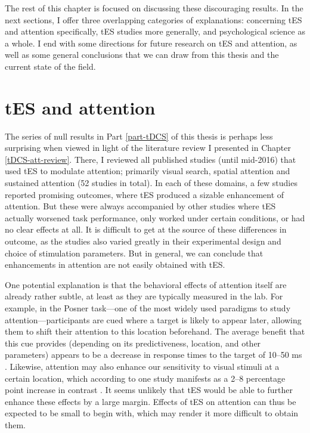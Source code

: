 \documentclass[11pt,english,]{memoir}
\begin{document}
The rest of this chapter is focused on discussing these discouraging results. In the next sections, I offer three overlapping categories of explanations: concerning tES and attention specifically, tES studies more generally, and psychological science as a whole. I end with some directions for future research on tES and attention, as well as some general conclusions that we can draw from this thesis and the current state of the field.

\hypertarget{tes-and-attention}{%
\section{tES and attention}\label{tes-and-attention}}

The series of null results in Part \ref{part-tDCS} of this thesis is perhaps less surprising when viewed in light of the literature review I presented in Chapter \ref{tDCS-att-review}. There, I reviewed all published studies (until mid-2016) that used tES to modulate attention; primarily visual search, spatial attention and sustained attention (52 studies in total). In each of these domains, a few studies reported promising outcomes, where tES produced a sizable enhancement of attention. But these were always accompanied by other studies where tES actually worsened task performance, only worked under certain conditions, or had no clear effects at all. It is difficult to get at the source of these differences in outcome, as the studies also varied greatly in their experimental design and choice of stimulation parameters. But in general, we can conclude that enhancements in attention are not easily obtained with tES.

One potential explanation is that the behavioral effects of attention itself are already rather subtle, at least as they are typically measured in the lab. For example, in the Posner task---one of the most widely used paradigms to study attention---participants are cued where a target is likely to appear later, allowing them to shift their attention to this location beforehand. The average benefit that this cue provides (depending on its predictiveness, location, and other parameters) appears to be a decrease in response times to the target of 10--50 ms \autocite{Chica2014}. Likewise, attention may also enhance our sensitivity to visual stimuli at a certain location, which according to one study manifests as a 2--8 percentage point increase in contrast \autocite{Carrasco2004}. It seems unlikely that tES would be able to further enhance these effects by a large margin. Effects of tES on attention can thus be expected to be small to begin with, which may render it more difficult to obtain them.
\end{document}

